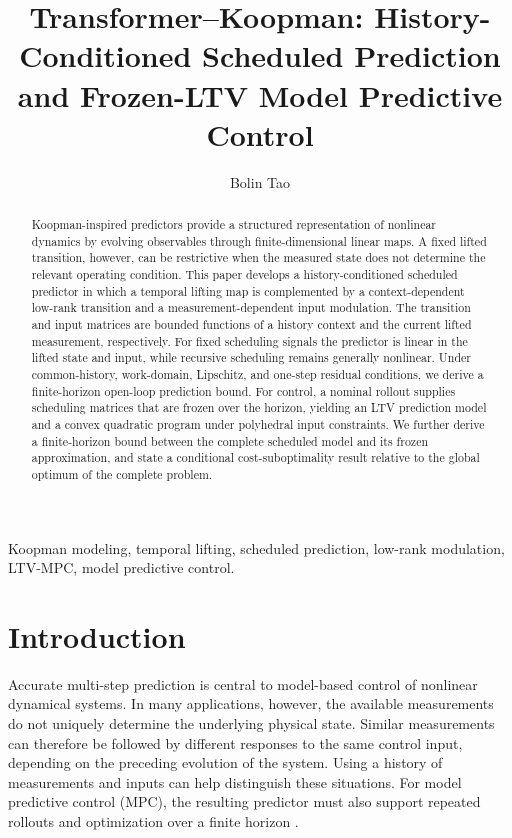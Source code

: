 \documentclass[journal]{IEEEtran}
\begin{document}
\title{Transformer--Koopman: History-Conditioned Scheduled Prediction and Frozen-LTV Model Predictive Control}
\author{Bolin Tao}
\maketitle

\begin{abstract}
Koopman-inspired predictors provide a structured representation of nonlinear dynamics by evolving observables through finite-dimensional linear maps. A fixed lifted transition, however, can be restrictive when the measured state does not determine the relevant operating condition. This paper develops a history-conditioned scheduled predictor in which a temporal lifting map is complemented by a context-dependent low-rank transition and a measurement-dependent input modulation. The transition and input matrices are bounded functions of a history context and the current lifted measurement, respectively. For fixed scheduling signals the predictor is linear in the lifted state and input, while recursive scheduling remains generally nonlinear. Under common-history, work-domain, Lipschitz, and one-step residual conditions, we derive a finite-horizon open-loop prediction bound. For control, a nominal rollout supplies scheduling matrices that are frozen over the horizon, yielding an LTV prediction model and a convex quadratic program under polyhedral input constraints. We further derive a finite-horizon bound between the complete scheduled model and its frozen approximation, and state a conditional cost-suboptimality result relative to the global optimum of the complete problem.
\end{abstract}

\begin{IEEEkeywords}
Koopman modeling, temporal lifting, scheduled prediction, low-rank modulation, LTV-MPC, model predictive control.
\end{IEEEkeywords}

\section{Introduction}
\label{sec:introduction}

Accurate multi-step prediction is central to model-based control of nonlinear dynamical systems. In many applications, however, the available measurements do not uniquely determine the underlying physical state. Similar measurements can therefore be followed by different responses to the same control input, depending on the preceding evolution of the system. Using a history of measurements and inputs can help distinguish these situations. For model predictive control (MPC), the resulting predictor must also support repeated rollouts and optimization over a finite horizon \cite{ljung1999system,nelles2020nonlinear,forgione2021dynonet}.
\end{document}

